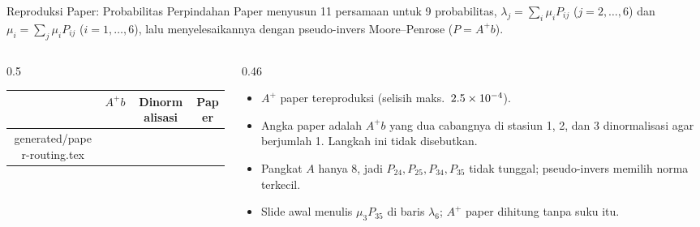 \documentclass[aspectratio=169]{beamer}
\makeatletter
\newcommand{\tablerows}[1]{\@@input generated/#1.tex }
\makeatother
\begin{document}
\begin{frame}{Reproduksi Paper: Probabilitas Perpindahan}
    \small
    Paper menyusun 11 persamaan untuk 9 probabilitas, $\lambda_j = \sum_i \mu_i P_{ij}$ ($j = 2,\dots,6$) dan $\mu_i = \sum_j \mu_i P_{ij}$ ($i = 1,\dots,6$), lalu menyelesaikannya dengan pseudo-invers Moore--Penrose ($P = A^{+} b$).
    \begin{columns}[T]
        \begin{column}{0.5\linewidth}
            \centering\footnotesize
            \begin{tabular}{cccc}
                \toprule
                & $A^{+}b$ & Dinormalisasi & Paper \\
                \midrule
                \tablerows{paper-routing}
                \bottomrule
            \end{tabular}
        \end{column}
        \begin{column}{0.46\linewidth}
            \footnotesize
            \begin{itemize}
                \item $A^{+}$ paper tereproduksi (selisih maks.\ $2.5\times10^{-4}$).
                \item Angka paper adalah $A^{+}b$ yang dua cabangnya di stasiun 1, 2, dan 3 dinormalisasi agar berjumlah 1. Langkah ini tidak disebutkan.
                \item Pangkat $A$ hanya 8, jadi $P_{24}, P_{25}, P_{34}, P_{35}$ tidak tunggal; pseudo-invers memilih norma terkecil.
                \item Slide awal menulis $\mu_3 P_{35}$ di baris $\lambda_6$; $A^{+}$ paper dihitung tanpa suku itu.
            \end{itemize}
        \end{column}
    \end{columns}
\end{frame}
\end{document}
